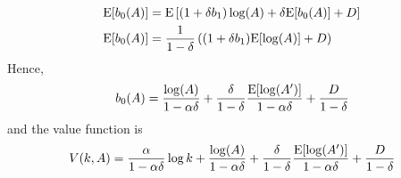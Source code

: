 \begin{example}
  \begin{align*}
    \mathrm{E}[b_0(A)] & = \mathrm{E}\left[(1+\delta b_1) \log(A) + \delta \mathrm{E}[b_0(A)]
                  + D \right] \\
    \mathrm{E}[b_0(A)] & = \frac{1}{1-\delta} \left( (1+\delta b_1)
                  \mathrm{E}[\log(A)] + D \right) 
  \end{align*}
  Hence,
  \[ b_0(A) = \frac{\log(A)}{1-\alpha \delta} +
    \frac{\delta}{1-\delta} \frac{\mathrm{E}[\log(A')]}{1-\alpha \delta} +
    \frac{D}{1-\delta} \]
  and the value function is
  \begin{align*}
    V(k,A) = \frac{\alpha}{1-\alpha \delta} \log k + \frac{\log(A)}{1-\alpha \delta} +
    \frac{\delta}{1-\delta} \frac{\mathrm{E}[\log(A')]}{1-\alpha \delta} +
    \frac{D}{1-\delta} 
  \end{align*}
\end{example}


\clearpage




